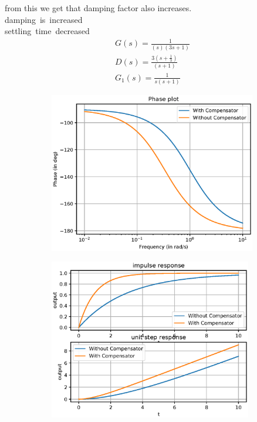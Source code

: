 \begin{enumerate}[label=\thesection.\arabic*.,ref=\thesection.\theenumi]
from this we get that damping factor also increases.\\

\implies damping\ is\ increased \\

\implies settling\ time\ decreased\\

\begin{align}
G(s) = \frac{1}{(s)(3s+1)}\\
D(s) = \frac{3(s+\frac{1}{3})}{(s+1)} \\
G_{1}(s) = \frac{1}{s(s+1)}
\end{align}

\begin{figure}
\begin{subfigure}{\textwidth}
\includegraphics[width=1\linewidth, height=7cm ,inner]{./figs/ee18btech11027/lead_compensator_phase.eps} 
\label{fig:subim1}
\end{subfigure}
\end{figure}

\begin{figure}
\begin{subfigure}{\textwidth}
\includegraphics[width=1\linewidth, height=7cm ,inner]{./figs/ee18btech11027/settling_time.eps} 
\label{fig:subim1}
\end{subfigure}
\end{figure}
    

\end{enumerate}

